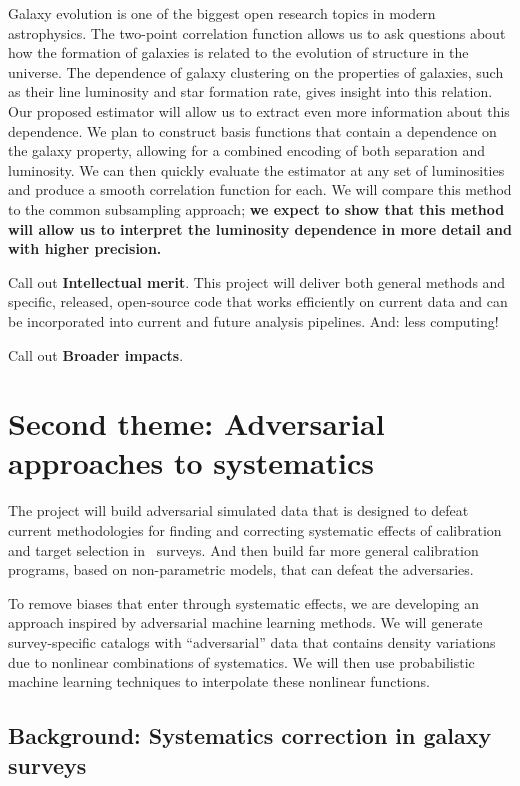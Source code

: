 \documentclass[12pt, fullpage, letterpaper]{article}
\begin{document}
Galaxy evolution is one of the biggest open research topics in modern astrophysics.
The two-point correlation function allows us to ask questions about how the formation of galaxies is related to the evolution of structure in the universe.
The dependence of galaxy clustering on the properties of galaxies, such as their line luminosity and star formation rate, gives insight into this relation.
Our proposed estimator will allow us to extract even more information about this dependence. 
We plan to construct basis functions that contain a dependence on the galaxy property, allowing for a combined encoding of both separation and luminosity. 
We can then quickly evaluate the estimator at any set of luminosities and produce a smooth correlation function for each. 
We will compare this method to the common subsampling approach; \textbf{we expect to show that this method will allow us to interpret the luminosity dependence in more detail and with higher precision.}

Call out \textbf{Intellectual merit}.
This project will deliver both general methods and specific, released,
open-source code that works efficiently on current data and can be
incorporated into current and future analysis pipelines. And: less computing!

Call out \textbf{Broader impacts}.



\section{Second theme: Adversarial approaches to systematics}

The project will build adversarial simulated data that is
designed to defeat current methodologies for finding and correcting
systematic effects of calibration and target selection in \LSS\ 
surveys. And then build far more general calibration
programs, based on non-parametric models, that can defeat the
adversaries.

To remove biases that enter through systematic effects, we are developing an approach inspired by adversarial machine learning methods. 
We will generate survey-specific catalogs with ``adversarial'' data that contains density variations due to nonlinear combinations of systematics.
We will then use probabilistic machine learning techniques to interpolate these nonlinear functions.

\subsection{Background: Systematics correction in galaxy surveys}
\end{document}
